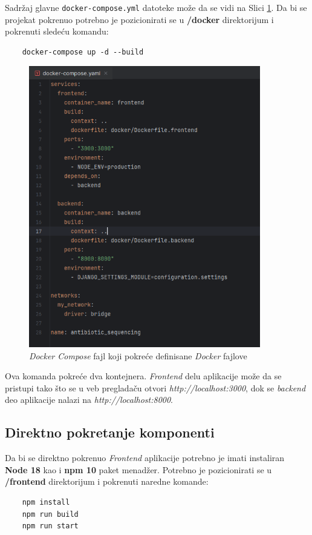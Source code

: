 \documentclass[12pt,oneside]{memoir}
\begin{document}
Sadržaj glavne \texttt{docker-compose.yml} datoteke može da se vidi na Slici \ref{fig:docker_compose}. Da bi se projekat pokrenuo potrebno je pozicionirati se u \textbf{/docker} direktorijum i pokrenuti sledeću komandu:
\begin{verbatim}
    docker-compose up -d --build
\end{verbatim}

\begin{figure}[h]
\centering
\includegraphics[width=0.9\textwidth]{images/docker_compose.png}
\caption{\emph{Docker Compose} fajl koji pokreće definisane \emph{Docker} fajlove}
\label{fig:docker_compose}
\end{figure}


Ova komanda pokreće dva kontejnera. \emph{Frontend} delu aplikacije može da se pristupi tako što se u veb pregladaču otvori \emph{http://localhost:3000}, dok se \emph{backend} deo aplikacije nalazi na \emph{http://localhost:8000}.

\subsection{Direktno pokretanje komponenti}

Da bi se direktno pokrenuo \emph{Frontend} aplikacije potrebno je imati instaliran \textbf{Node 18} kao i \textbf{npm 10} paket menadžer. Potrebno je pozicionirati se u \textbf{/frontend} direktorijum i pokrenuti naredne komande:
\begin{verbatim}
    npm install
    npm run build
    npm run start
\end{verbatim}
\end{document}
